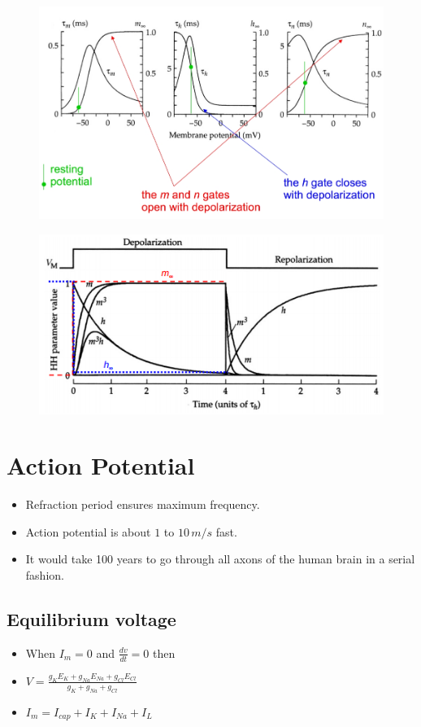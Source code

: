 \documentclass[a4paper, 12pt]{article}
\begin{document}
\begin{figure}[H]
	\centering
	\includegraphics[scale=0.5]{5_8.jpg}
\end{figure} 
\begin{figure}[H]
	\centering
	\includegraphics[scale=1.0]{depolarization_01.png}
\end{figure} 

\section{Action Potential}
\begin{itemize}[noitemsep,nolistsep]
	\item Refraction period ensures maximum frequency.
	\item Action potential is about $1$ to $10\,m/s$ fast.
	\item It would take 100 years to go through all axons of the human brain in a serial fashion.
\end{itemize}
\subsection{Equilibrium voltage}
\begin{itemize}[noitemsep,nolistsep]
	\item When $I_m = 0$ and $\frac{dv}{dt}=0$ then
	\item $V=\frac{g_KE_K+g_{Na}E_{Na}+g_{Cl}E_{Cl}}{g_K+g_{Na}+g_{Cl}}$
	\item $I_m = I_{cap}+I_K+I_{Na}+I_{L}$
\end{itemize}
\end{document}
